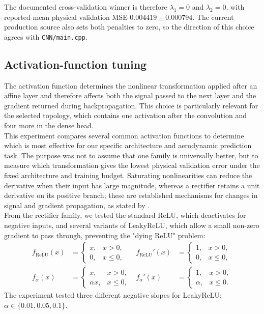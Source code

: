 The documented cross-validation winner is therefore $\lambda_1=0$ and $\lambda_2=0$, with reported mean physical validation MSE $0.004419\pm0.000794$. The current production source also sets both penalties to zero, so the direction of this choice agrees with \texttt{CNN/main.cpp}. 

\subsection{Activation-function tuning}
\label{sec:04_activation_tuning}

The activation function determines the nonlinear transformation applied after an affine layer and therefore affects both the signal passed to the next layer and the gradient returned during backpropagation. This choice is particularly relevant for the selected topology, which contains one activation after the convolution and four more in the dense head.\\

This experiment compares several common activation functions to determine which is most effective for our specific architecture and aerodynamic prediction task. The purpose was not to assume that one family is universally better, but to measure which transformation gives the lowest physical validation error under the fixed architecture and training budget. Saturating nonlinearities can reduce the derivative when their input has large magnitude, whereas a rectifier retains a unit derivative on its positive branch; these are established mechanisms for changes in signal and gradient propagation, as stated by \cite{glorot2010understanding}.\\

From the rectifier family, we tested the standard ReLU, which deactivates for negative inputs, and several variants of LeakyReLU, which allow a small non-zero gradient to pass through, preventing the "dying ReLU" problem:
\begin{equation}
\begin{aligned}
    f_{\mathrm{ReLU}}(x)&=\begin{cases}
        x, & x>0,\\
        0, & x\leq0,
    \end{cases}
    & f_{\mathrm{ReLU}}'(x)&=\begin{cases}
        1, & x>0,\\
        0, & x\leq0,
    \end{cases}\\[1ex]
    f_{\alpha}(x)&=\begin{cases}
        x, & x>0,\\
        \alpha x, & x\leq0,
    \end{cases}
    & f_{\alpha}'(x)&=\begin{cases}
        1, & x>0,\\
        \alpha, & x\leq0.
    \end{cases}
\end{aligned}
    \label{eq:04_rectifier_activations}
\end{equation}
The experiment tested three different negative slopes for LeakyReLU: $\alpha\in\{0.01,0.05,0.1\}$.\\

